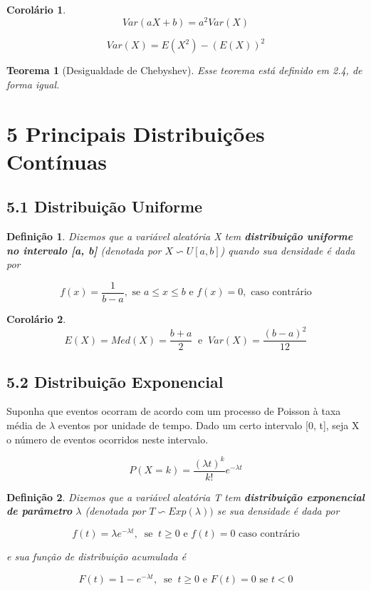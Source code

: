 \documentclass[12pt]{article}
\newtheorem{theorem}{Teorema}[section]
\newtheorem{corollary}{Corolário}[theorem]
\newtheorem{definition}{Definição}
\begin{document}
\begin{corollary}
    $$Var(a X + b) = a^2 Var(X)$$
    
    $$Var(X) = E(X^2) - (E(X))^2$$
\end{corollary}

\begin{theorem}[Desigualdade de Chebyshev]
    Esse teorema está definido em 2.4, de forma igual.
\end{theorem}

\section*{5 Principais Distribuições Contínuas}
\label{s20}

\subsection*{5.1 Distribuição Uniforme}
\label{s21}

\begin{definition}
    Dizemos que a variável aleatória X tem \textbf{distribuição uniforme no intervalo [a, b]} (denotada por $X \backsim U[a, b]$) quando sua densidade é dada por
    
    $$f(x) = \frac{1}{b - a}, \text{ se } a \leq x \leq b \text{ e } f(x) = 0 ,\text{ caso contrário}$$
\end{definition}

\begin{corollary}
    $$E(X) = Med(X) = \frac{b + a}{2} \ \text{ e } \ Var(X) = \frac{(b - a)^2}{12}$$
\end{corollary}

\subsection*{5.2 Distribuição Exponencial}
\label{s22}

Suponha que eventos ocorram de acordo com um processo de Poisson à taxa média de $\lambda$ eventos por unidade de tempo. Dado um certo intervalo [0, t], seja X o número de eventos ocorridos neste intervalo.

$$P(X = k) = \dfrac{(\lambda t)^k}{k!} e^{-\lambda t}$$

\begin{definition}
    Dizemos que a variável aleatória T tem \textbf{distribuição exponencial de parâmetro} $\lambda$ (denotada por $T \backsim Exp(\lambda))$ se sua densidade é dada por
    
    $$f(t) = \lambda e^{- \lambda t}, \ \text{ se } \ t \geq 0 \text{ e } f(t) = 0 \text{ caso contrário}$$
    
    e sua função de distribuição acumulada é
    
    $$F(t) = 1 - e^{- \lambda t}, \ \text{ se } \ t \geq 0 \text{ e } F(t) = 0 \text{ se } t < 0$$
\end{definition}
\end{document}

